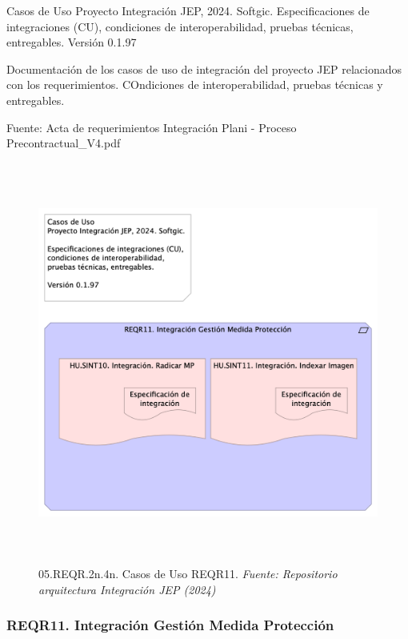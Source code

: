 \documentclass[
  paper=a4,
  ,captions=tableheading
]{scrartcl}
\renewenvironment{quote}{\begin{customblockquote}\list{}{\rightmargin=0em\leftmargin=0em}%
\item\relax\color{blockquote-text}\ignorespaces}{\unskip\unskip\endlist\end{customblockquote}}
\begin{document}
\begin{quote}
Casos de Uso Proyecto Integración JEP, 2024. Softgic. Especificaciones
de integraciones (CU), condiciones de interoperabilidad, pruebas
técnicas, entregables. Versión 0.1.97
\end{quote}

Documentación de los casos de uso de integración del proyecto JEP
relacionados con los requerimientos. COndiciones de interoperabilidad,
pruebas técnicas y entregables.

Fuente: Acta de requerimientos Integración Plani - Proceso
Precontractual\_V4.pdf

\begin{figure}
\centering
\includegraphics[width=\textwidth,height=5.20833in]{images/05.REQR.2n.4n.CasosdeUsoREQR11.png}
\caption{05.REQR.2n.4n. Casos de Uso REQR11. \emph{Fuente: Repositorio
arquitectura Integración JEP
(2024)}}\label{fig:id-086d2945e90743568dc1ce48079c40bf}
\end{figure}

\subsubsection{REQR11. Integración Gestión Medida
Protección}\label{sec:reqr11.-integraciuxf3n-gestiuxf3n-medida-protecciuxf3n-1}
\end{document}
